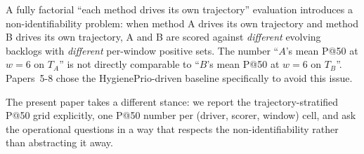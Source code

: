A fully factorial ``each method drives its own trajectory'' evaluation
introduces a non-identifiability problem: when method A drives its own
trajectory and method B drives its own trajectory, A and B are scored
against \textit{different} evolving backlogs with \textit{different}
per-window positive sets. The number ``$A$'s mean P@50 at $w = 6$ on
$T_A$'' is not directly comparable to ``$B$'s mean P@50 at $w = 6$ on
$T_B$''. Papers~5-8 chose the HygienePrio-driven baseline specifically
to avoid this issue.

The present paper takes a different stance: we report the trajectory-stratified
P@50 grid explicitly, one P@50 number per (driver, scorer, window) cell, 
and ask the operational questions in a way that respects the
non-identifiability rather than abstracting it away.

